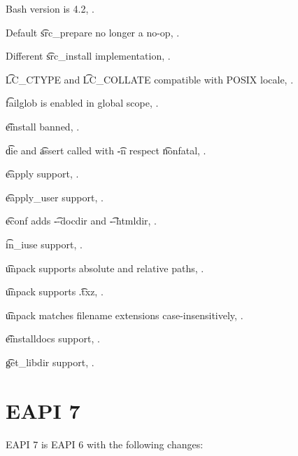 \begin{compactitem}
\item Bash version is 4.2, .
\item Default \t{src_prepare} no longer a no-op, .
\item Different \t{src_install} implementation, .
\item \t{LC_CTYPE} and \t{LC_COLLATE} compatible with POSIX locale, .
\item \t{failglob} is enabled in global scope, .
\item \t{einstall} banned, .
\item \t{die} and \t{assert} called with \t{-n} respect \t{nonfatal}, .
\item \t{eapply} support, .
\item \t{eapply_user} support, .
\item \t{econf} adds \t{-{}-docdir} and \t{-{}-htmldir}, .
\item \t{in_iuse} support, .
\item \t{unpack} supports absolute and relative paths, .
\item \t{unpack} supports \t{.txz}, .
\item \t{unpack} matches filename extensions case-insensitively, .
\item \t{einstalldocs} support, .
\item \t{get_libdir} support, .
\end{compactitem}

\section{EAPI 7}

EAPI 7 is EAPI 6 with the following changes:

